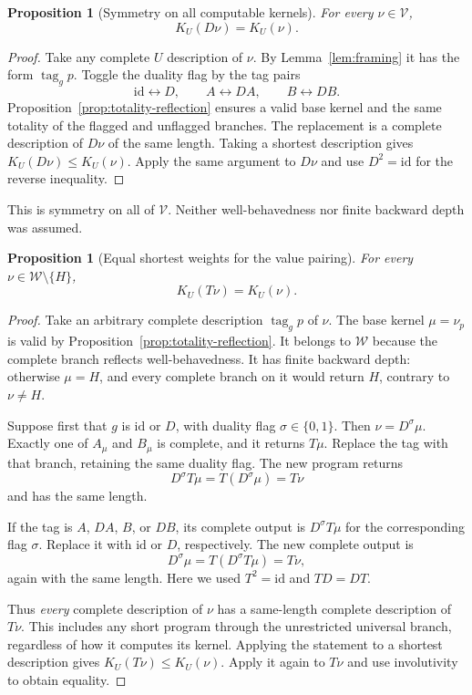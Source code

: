 \documentclass[11pt]{article}
\newtheorem{proposition}[theorem]{Proposition}
\theoremstyle{definition}
\theoremstyle{remark}
\newcommand{\V}{\mathcal V}
\newcommand{\W}{\mathcal W}
\newcommand{\id}{\mathrm{id}}
\newcommand{\tagword}{\operatorname{tag}}
\begin{document}
\begin{proposition}[Symmetry on all computable kernels]
\label{prop:shortest-duality}
For every $\nu\in\V$,
\[
  K_U(D\nu)=K_U(\nu).
\]
\end{proposition}

\begin{proof}
Take any complete $U$ description of $\nu$.  By
Lemma~\ref{lem:framing} it has the form $\tagword_g p$.  Toggle
the duality flag by the tag pairs
\[
  \id\longleftrightarrow D,\qquad
  A\longleftrightarrow DA,\qquad
  B\longleftrightarrow DB.
\]
Proposition~\ref{prop:totality-reflection} ensures a valid base
kernel and the same totality of the flagged and unflagged branches.
The replacement is a complete description of $D\nu$ of the same
length.  Taking a shortest description gives
$K_U(D\nu)\le K_U(\nu)$.  Apply the same argument to $D\nu$
and use $D^2=\id$ for the reverse inequality.
\end{proof}

This is symmetry on all of $\V$.  Neither well-behavedness nor
finite backward depth was assumed.

\begin{proposition}[Equal shortest weights for the value pairing]
\label{prop:shortest-pairing}
For every $\nu\in\W\setminus\{H\}$,
\begin{equation}
  K_U(T\nu)=K_U(\nu).
  \label{eq:shortest-pairing}
\end{equation}
\end{proposition}

\begin{proof}
Take an arbitrary complete description $\tagword_g p$ of $\nu$.
The base kernel $\mu=\nu_p$ is valid by
Proposition~\ref{prop:totality-reflection}.  It belongs to $\W$
because the complete branch reflects well-behavedness.  It has finite
backward depth: otherwise $\mu=H$, and every complete branch on it
would return $H$, contrary to $\nu\ne H$.

Suppose first that $g$ is $\id$ or $D$, with duality flag
$\sigma\in\{0,1\}$.  Then $\nu=D^\sigma\mu$.
Exactly one of $A_\mu$ and $B_\mu$ is complete, and it returns
$T\mu$.  Replace the tag with that branch, retaining the same
duality flag.  The new program returns
\[
  D^\sigma T\mu=T(D^\sigma\mu)=T\nu
\]
and has the same length.

If the tag is $A$, $DA$, $B$, or $DB$, its complete output is
$D^\sigma T\mu$ for the corresponding flag $\sigma$.  Replace
it with $\id$ or $D$, respectively.  The new complete output is
\[
  D^\sigma\mu=T(D^\sigma T\mu)=T\nu,
\]
again with the same length.  Here we used $T^2=\id$ and $TD=DT$.

Thus \emph{every} complete description of $\nu$ has a same-length
complete description of $T\nu$.  This includes any short program
through the unrestricted universal branch, regardless of how it
computes its kernel.  Applying the statement to a shortest
description gives $K_U(T\nu)\le K_U(\nu)$.  Apply it again to
$T\nu$ and use involutivity to obtain equality.
\end{proof}
\end{document}
